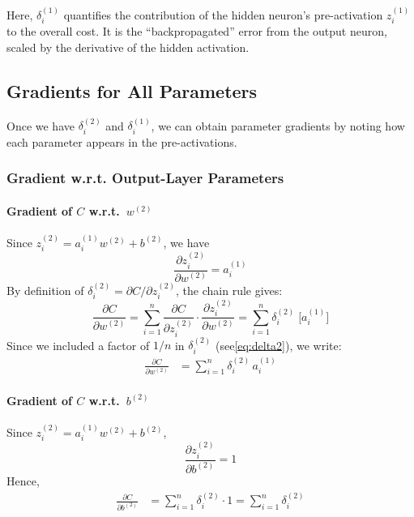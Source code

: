 \documentclass{article}
\begin{document}
\noindent Here, \(\delta_i^{(1)}\) quantifies the contribution of the hidden neuron's pre-activation \(z_i^{(1)}\) to the overall cost.  It is the “backpropagated” error from the output neuron, scaled by the derivative of the hidden activation.

\subsection{Gradients for All Parameters}\label{sec:two-neuron-gradients}

\noindent Once we have \(\delta_i^{(2)}\) and \(\delta_i^{(1)}\), we can obtain parameter gradients by noting how each parameter appears in the pre-activations.

\subsubsection{Gradient w.r.t. Output-Layer Parameters}\label{sec:grad-output}

\paragraph{Gradient of \(C\) w.r.t.\ \(w^{(2)}\)\\}
Since \(z_i^{(2)} = a_i^{(1)} w^{(2)} + b^{(2)}\), we have
\[
    \frac{\partial z_i^{(2)}}{\partial w^{(2)}} = a_i^{(1)}
\]
By definition of \(\delta_i^{(2)} = \partial C/\partial z_i^{(2)}\), the chain rule gives:
\[
    \frac{\partial C}{\partial w^{(2)}}
    = \sum_{i=1}^{n} \frac{\partial C}{\partial z_i^{(2)}} \cdot \frac{\partial z_i^{(2)}}{\partial w^{(2)}}
    = \sum_{i=1}^{n} \delta_i^{(2)} \;\bigl[a_i^{(1)}\bigr]
\]
Since we included a factor of \(1/n\) in \(\delta_i^{(2)}\) (see\eqref{eq:delta2}), we write:
\begin{align}
    \frac{\partial C}{\partial w^{(2)}}
    &= \sum_{i=1}^{n} \delta_i^{(2)} \,a_i^{(1)}
    \label{eq:grad-w2}
\end{align}

\paragraph{Gradient of \(C\) w.r.t.\ \(b^{(2)}\)\\}
Since \(z_i^{(2)} = a_i^{(1)} w^{(2)} + b^{(2)}\),
\[
    \frac{\partial z_i^{(2)}}{\partial b^{(2)}} = 1
\]
Hence,
\begin{align}
    \frac{\partial C}{\partial b^{(2)}}
    &= \sum_{i=1}^{n} \delta_i^{(2)} \cdot 1
    = \sum_{i=1}^{n} \delta_i^{(2)}
    \label{eq:grad-b2}
\end{align}
\end{document}
